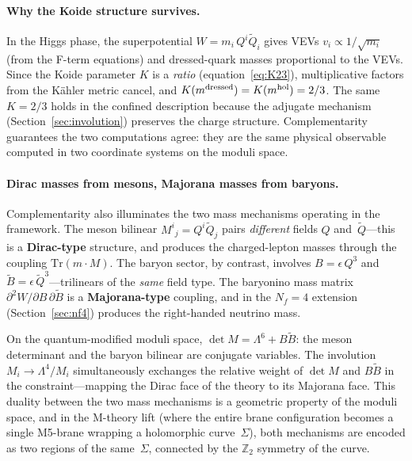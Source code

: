 \documentclass[12pt,a4paper]{article}
\newcommand{\Nf}{N_f}
\newcommand{\Tr}{\mathrm{Tr}}
\begin{document}
\paragraph{Why the Koide structure survives.}
In the Higgs phase, the superpotential $W = m_i\,Q^i\tilde{Q}_i$
gives VEVs $v_i \propto 1/\sqrt{m_i}$ (from the F-term equations)
and dressed-quark masses proportional to the VEVs.
Since the Koide parameter $K$ is a \emph{ratio}
(equation~\eqref{eq:K23}), multiplicative factors from the
K\"ahler metric cancel, and $K(m^{\rm dressed}) = K(m^{\rm hol})
= 2/3$.  The same $K = 2/3$ holds in the confined description
because the adjugate mechanism
(Section~\ref{sec:involution}) preserves the charge structure.
Complementarity guarantees the two computations agree: they are
the same physical observable computed in two coordinate systems
on the moduli space.

\paragraph{Dirac masses from mesons, Majorana masses from baryons.}
Complementarity also illuminates the two mass mechanisms operating
in the framework.  The meson bilinear $M^i{}_j = Q^i\tilde{Q}_j$
pairs \emph{different} fields $Q$ and~$\tilde{Q}$---this is a
\textbf{Dirac-type} structure, and produces the charged-lepton
masses through the coupling $\Tr(m \cdot M)$.
The baryon sector, by contrast, involves $B = \epsilon\,Q^3$ and
$\tilde{B} = \epsilon\,\tilde{Q}^3$---trilinears of the
\emph{same} field type.  The baryonino mass matrix
$\partial^2 W/\partial B\,\partial\tilde{B}$ is a
\textbf{Majorana-type} coupling, and in the $\Nf = 4$ extension
(Section~\ref{sec:nf4}) produces the right-handed neutrino mass.

On the quantum-modified moduli space, $\det M = \Lambda^6
+ B\tilde{B}$: the meson determinant and the baryon bilinear
are conjugate variables.  The involution $M_i \to \Lambda^4/M_i$
simultaneously exchanges the relative weight of $\det M$ and
$B\tilde{B}$ in the constraint---mapping the Dirac face of the
theory to its Majorana face.  This duality between the two mass
mechanisms is a geometric property of the moduli space, and in
the M-theory lift (where the entire brane configuration becomes a
single M5-brane wrapping a holomorphic curve~$\Sigma$), both
mechanisms are encoded as two regions of the same~$\Sigma$,
connected by the $\mathbb{Z}_2$ symmetry of the curve.
\end{document}
